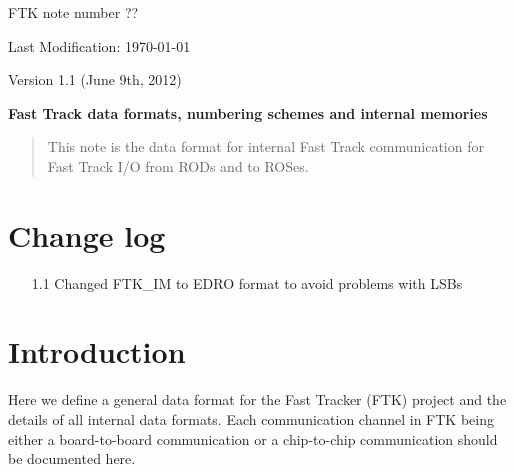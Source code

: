 \documentclass[10pt]{article}
\numberwithin{figure}{section}
\numberwithin{equation}{section}
\numberwithin{table}{section}
\newcommand{\0}{\phantom{0}}
\begin{document}
 
\thispagestyle{empty}
\hfill {FTK note number ??}  

\hfill Last Modification: \today  

\hfill Version 1.1 (June 9th, 2012)
\vspace{2cm}
{\center

{\bf \LARGE Fast Track data formats, numbering schemes and internal memories}
\vspace{1cm}

\large 
\vspace{1cm}
 }
\vspace{2cm}

\begin{abstract}
This note is the data format for internal Fast Track communication for Fast Track I/O from RODs and to ROSes.
\end{abstract}

%

\baselineskip 16pt %
\newpage

\tableofcontents
\newpage

\section{Change log} 

\begin{enumerate}
\item[1.1] Changed FTK\_IM to EDRO format to avoid problems with LSBs
\end{enumerate}

\section{Introduction} 
Here we define a general data format for the Fast Tracker (FTK) project and the details of all internal data formats.
Each communication channel in FTK being either a board-to-board communication or a chip-to-chip communication should be documented here.
\end{document}
